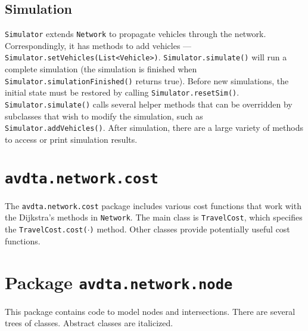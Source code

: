 \subsection{Simulation}

\texttt{Simulator} extends \texttt{Network} to propagate vehicles through the network. Correspondingly, it has methods to add vehicles --- \texttt{Simulator.setVehicles(List<Vehicle>)}.  
%
\texttt{Simulator.simulate()} will run a complete simulation (the simulation is finished when \texttt{Simulator.simulationFinished()} returns true). Before new simulations, the initial state must be restored by calling \texttt{Simulator.resetSim()}. \texttt{Simulator.simulate()} calls several helper methods that can be overridden by subclasses that wish to modify the simulation, such as \texttt{Simulator.addVehicles()}. After simulation, there are a large variety of methods to access or print simulation results.

\section{\texttt{avdta.network.cost}}
\label{api:pathcost}

The \texttt{avdta.network.cost} package includes various cost functions that work with the Dijkstra's methods in \texttt{Network}. The main class is \texttt{TravelCost}, which specifies the \texttt{TravelCost.cost($\cdot$)} method. Other classes provide potentially useful cost functions.

\section{Package \texttt{avdta.network.node}}

This package contains code to model nodes and intersections. There are several trees of classes. Abstract classes are italicized.

